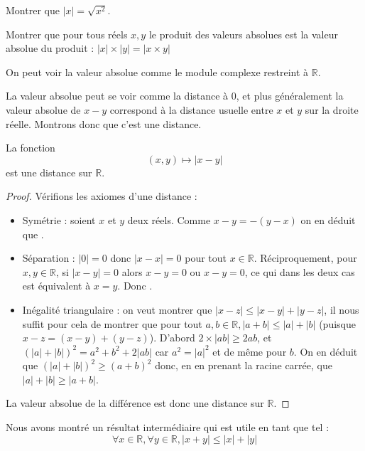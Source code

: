 \begin{exo}
    Montrer que $|x| = \sqrt{x^2}$.
\end{exo}

\begin{exo}
    Montrer que pour tous réels $x,y$ le produit des valeurs absolues est la valeur absolue du produit : $|x|\times|y|=|x\times y|$
\end{exo}

\begin{rmk}
    On peut voir la valeur absolue comme le module complexe restreint à $\mathbb R$.
\end{rmk}

La valeur absolue peut se voir comme la distance à $0$, et plus généralement la valeur absolue de $x-y$ correspond à la distance usuelle entre $x$ et $y$ sur la droite réelle. Montrons donc que c'est une distance.

\begin{prop}
    La fonction $$(x,y)\mapsto |x-y|$$ est une distance sur  $\mathbb R$.
\end{prop}

\begin{proof}
    Vérifions les axiomes d'une distance :
    \begin{itemize}[label=$\bullet$]
        \item Symétrie : soient $x$ et $y$ deux réels. Comme $x-y=-(y-x)$ on en déduit que .
        \item Séparation : $|0|=0$ donc $|x-x|=0$ pour tout $x\in\mathbb R$. Réciproquement, pour $x,y\in\mathbb R$, si $|x-y|=0$ alors $x-y = 0$ ou $x-y=0$, ce qui dans les deux cas est équivalent à $x=y$. Donc .
        \item Inégalité triangulaire : on veut montrer que $|x-z| \leq |x-y|+|y-z|$, il nous suffit pour cela de montrer que pour tout $a,b\in\mathbb R, |a+b|\leq |a|+|b|$ (puisque $x-z=(x-y)+(y-z)$). D'abord $2\times|ab| \geq 2ab$, et $(|a|+|b|)^2 = a^2+b^2+2|ab|$ car $a^2=|a|^2$ et de même pour $b$. On en déduit que $(|a|+|b|)^2 \geq (a+b)^2$ donc, en en prenant la racine carrée, que $|a|+|b| \geq |a+b|$.
    \end{itemize}
    La valeur absolue de la différence est donc une distance sur $\mathbb R$.
\end{proof}

\begin{cor}
    Nous avons montré un résultat intermédiaire qui est utile en tant que tel : $$\forall x\in\mathbb R,\forall y\in \mathbb R, |x+y|\leq |x|+|y|$$
\end{cor}

